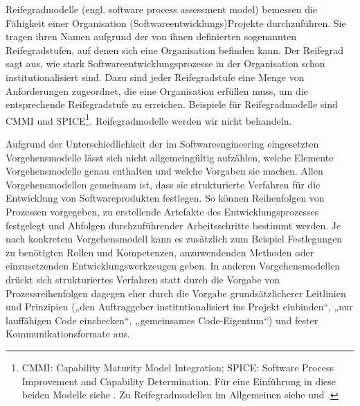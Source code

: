 Reifegradmodelle (engl. software process assessment model) 
bemessen die Fähigkeit einer Organisation (Softwareentwicklungs)Projekte durchzuführen. Sie tragen ihren Namen aufgrund der von ihnen definierten sogenannten Reifegradstufen, auf denen sich eine Organisation befinden kann. Der Reifegrad sagt aus, wie stark Softwareentwicklungsprozesse in der Organisation schon institutionalisiert sind. Dazu sind jeder Reifegradstufe eine Menge von Anforderungen zugeordnet, die eine Organisation erfüllen muss, um die entsprechende Reifegradstufe zu erreichen. Beispiele für Reifegradmodelle sind CMMI und SPICE\footnote{CMMI: Capability Maturity Model Integration; SPICE: Software Process Improvement and Capability Determination. Für eine Einführung in diese beiden Modelle siehe \cite[565-590]{bal08}. Zu Reifegradmodellen im Allgemeinen siehe \cite[Kap. 8]{swe14} und \cite{sha11}.}. Reifegradmodelle werden wir nicht behandeln.

\pagebreak %

Aufgrund der Unterschiedlichkeit 
der im Softwareengineering eingesetzten Vorgehensmodelle lässt sich nicht allgemeingültig aufzählen, welche Elemente Vorgehensmodelle genau enthalten und welche Vorgaben sie machen. Allen Vorgehensmodellen gemeinsam ist, dass sie strukturierte Verfahren für die Entwicklung von Softwareprodukten festlegen. So können Reihenfolgen von Prozessen vorgegeben, zu erstellende Artefakte des Entwicklungsprozesses festgelegt und Abfolgen durchzuführender Arbeitsschritte bestimmt werden. Je nach konkretem Vorgehensmodell kann es zusätzlich zum Beispiel Festlegungen zu benötigten Rollen und Kompetenzen, anzuwendenden Methoden oder einzusetzenden Entwicklungswerkzeugen geben. In anderen Vorgehensmodellen drückt sich strukturiertes Verfahren statt durch die Vorgabe von Prozessreihenfolgen dagegen eher durch die Vorgabe grundsätzlicherer Leitlinien und Prinzipien (\zb „den Auftraggeber institutionalisiert ins Projekt einbinden“, „nur lauffähigen Code einchecken“, „gemeinsames Code-Eigentum“) und fester Kommunikationsformate aus.